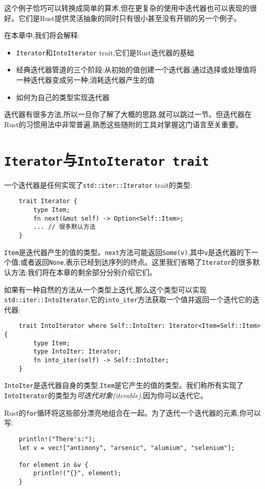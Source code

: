 这个例子恰巧可以转换成简单的算术,但在更复杂的使用中迭代器也可以表现的很好。它们是Rust提供灵活抽象的同时只有很小甚至没有开销的另一个例子。

在本章中,我们将会解释:
\begin{itemize}
    \item \texttt{Iterator}和\texttt{IntoIterator} trait,它们是Rust迭代器的基础
    \item 经典迭代器管道的三个阶段:从初始的值创建一个迭代器;通过选择或处理值将一种迭代器变成另一种;消耗迭代器产生的值
    \item 如何为自己的类型实现迭代器
\end{itemize}

迭代器有很多方法,所以一旦你了解了大概的思路,就可以跳过一节。但迭代器在Rust的习惯用法中非常普遍,熟悉这些随附的工具对掌握这门语言至关重要。

\section{\texttt{Iterator}与\texttt{IntoIterator trait}}\label{iter}

一个迭代器是任何实现了\texttt{std::iter::Iterator} trait的类型:
\begin{verbatim}
    trait Iterator {
        type Item;
        fn next(&mut self) -> Option<Self::Item>;
        ... // 很多默认方法
    }
\end{verbatim}

\texttt{Item}是迭代器产生的值的类型。\texttt{next}方法可能返回\texttt{Some(v)},其中\texttt{v}是迭代器的下一个值;或者返回\texttt{None},表示已经到达序列的终点。这里我们省略了\texttt{Iterator}的很多默认方法;我们将在本章的剩余部分分别介绍它们。

如果有一种自然的方法从一个类型上迭代,那么这个类型可以实现\texttt{std::iter::IntoIterator},它的\texttt{into\_iter}方法获取一个值并返回一个迭代它的迭代器:
\begin{verbatim}
    trait IntoIterator where Self::IntoIter: Iterator<Item=Self::Item> {
        type Item;
        type IntoIter: Iterator;
        fn into_iter(self) -> Self::IntoIter;
    }
\end{verbatim}

\texttt{IntoIter}是迭代器自身的类型,\texttt{Item}是它产生的值的类型。我们称所有实现了\texttt{IntoIterator}的类型为\emph{可迭代对象(iterable)},因为你可以迭代它。

Rust的\texttt{for}循环将这些部分漂亮地组合在一起。为了迭代一个迭代器的元素,你可以写:
\begin{verbatim}
    println!("There's:");
    let v = vec!["antimony", "arsenic", "alumium", "selenium"];

    for element in &v {
        println!("{}", element);
    }
\end{verbatim}

